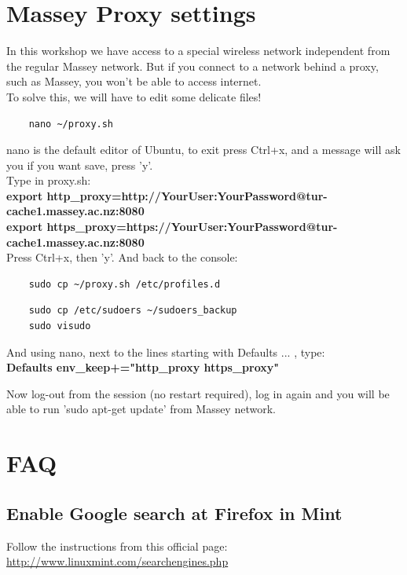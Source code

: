 \documentclass[a4paper]{article}
\begin{document}
\section{Massey Proxy settings}
\label{sec:massey_proxy_settings}
In this workshop we have access to a special wireless network independent from the regular Massey network. But if you connect to a network behind a proxy, such as Massey, you won't be able to access internet.\\
To solve this, we will have to edit some delicate files!\\
\begin{lstlisting}
    nano ~/proxy.sh
\end{lstlisting}
nano is the default editor of Ubuntu, to exit press Ctrl+x, and a message will ask you if you want save, press 'y'.\\ Type in proxy.sh:\\
\textbf{export http\_proxy=http://YourUser:YourPassword@tur-cache1.massey.ac.nz:8080}\\
\textbf{export https\_proxy=https://YourUser:YourPassword@tur-cache1.massey.ac.nz:8080}\\

Press Ctrl+x, then 'y'. And back to the console:\\
\begin{lstlisting}
    sudo cp ~/proxy.sh /etc/profiles.d
\end{lstlisting}
\begin{lstlisting}
    sudo cp /etc/sudoers ~/sudoers_backup
    sudo visudo
\end{lstlisting}
And using nano, next to the lines starting with Defaults ... , type:\\
\textbf{Defaults        env\_keep+="http\_proxy https\_proxy"}

Now log-out from the session (no restart required), log in again and you will be able to run 'sudo apt-get update' from Massey network.


\section{FAQ}
\subsection{Enable Google search at Firefox in Mint}
Follow the instructions from this official page: \url{http://www.linuxmint.com/searchengines.php}\\
\end{document}
